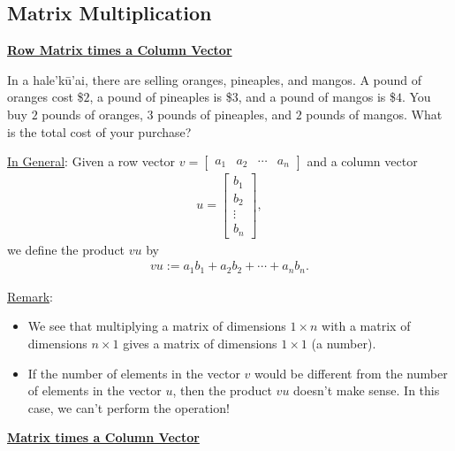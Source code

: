 \documentclass[12pt,a4paper]{article}
\newcounter{example}[section]
\begin{document}
\newpage

\subsection{Matrix Multiplication}

	\noindent\underline{\textbf{Row Matrix times a Column Vector}}
	
	\vspace*{12pt}
	
	\begin{example}
	In a hale'kū'ai, there are selling oranges, pineaples, and mangos. A pound of oranges cost \$$2$, a pound of pineaples is \$$3$, and a pound of mangos is \$$4$. You buy $2$ pounds of oranges, $3$ pounds of pineaples, and $2$ pounds of mangos. What is the total cost of your purchase?
	\end{example}
	
	\vfill
	
	\noindent\underline{In General}: Given a row vector $v = \begin{bmatrix} a_1 & a_2 & \cdots & a_n \end{bmatrix}$ and a column vector
		\begin{align*}
		u = \begin{bmatrix}
		b_1 \\ b_2 \\ \vdots \\ b_n
		\end{bmatrix} ,
		\end{align*}
	we define the product $v u$ by
		\begin{align*}
		v u := a_1 b_1 + a_2 b_2 + \cdots + a_n b_n .
		\end{align*}
		
	\noindent\underline{Remark}: 
		\begin{itemize}
		\item We see that multiplying a matrix of dimensions $1 \times n$ with a matrix of dimensions $n \times 1$ gives a matrix of dimensions $1 \times 1$ (a number).
		\item If the number of elements in the vector $v$ would be different from the number of elements in the vector $u$, then the product $vu$ doesn't make sense. In this case, we can't perform the operation!
		\end{itemize}
		

\newpage

	\noindent\underline{\textbf{Matrix times a Column Vector}}
	
\end{document}
